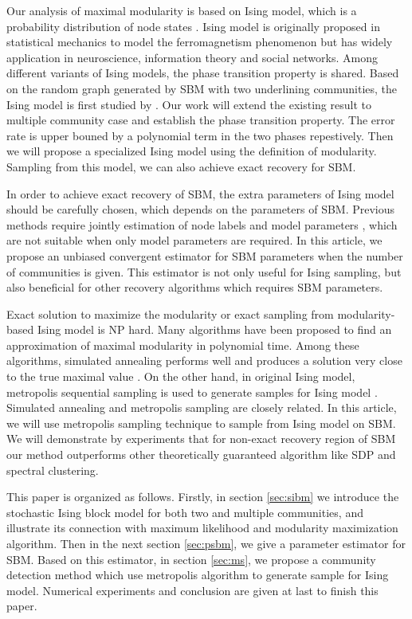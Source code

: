 \documentclass[journal]{IEEEtran}
\newcommand{\1}{\mathbbm{1}}
\begin{document}
Our analysis of maximal modularity is based on Ising model, which is a probability distribution of node states \cite{ising1925beitrag}.
Ising model is originally proposed in statistical mechanics to model the ferromagnetism phenomenon but has widely application in neuroscience, information theory
and social networks. Among different variants of Ising models, the phase transition property is shared. Based on the random graph generated by SBM with two underlining communities,
the Ising model is first studied by \cite{ye2020exact}. Our work will extend the existing result to multiple community case and establish the phase transition
property. The error rate is upper bouned by a polynomial term in the two phases repestively. Then we will propose a specialized Ising model using the definition of modularity. Sampling from this model,
we can also achieve exact recovery for SBM.

In order to achieve exact recovery of SBM, the extra parameters of Ising model should be carefully chosen, which depends on the parameters of SBM. 
Previous methods require jointly estimation of node labels and model parameters \cite{nowicki2001estimation}, which are not suitable when only model parameters are required.
In this article, we propose an unbiased convergent estimator for SBM parameters when the number of communities is given. This estimator is not only useful
for Ising sampling, but also beneficial for other recovery algorithms which requires SBM parameters.

Exact solution to maximize the modularity or exact sampling from modularity-based Ising model is NP hard. Many algorithms have been proposed to find an approximation of maximal modularity in polynomial time.
Among these algorithms, simulated annealing performs well and produces a solution very close to the true maximal value \cite{liu2010detecting}.
On the other hand, in original Ising model,
metropolis sequential sampling is used to generate samples for Ising model \cite{metropolis1953equation}. Simulated annealing and metropolis sampling are closely related. In this article, we will
use metropolis sampling technique to sample from Ising model on SBM. We will demonstrate by experiments that for non-exact recovery region of SBM our method outperforms other
theoretically guaranteed algorithm like SDP and spectral clustering.

This paper is organized as follows. Firstly, in section \ref{sec:sibm} we introduce the stochastic Ising block model for both two and multiple communities, and illustrate its connection with maximum likelihood and modularity
maximization algorithm. Then in the next section \ref{sec:psbm}, we give a parameter estimator for SBM. Based on this estimator, in section \ref{sec:ms},
we propose a community detection method which use metropolis algorithm to generate sample for Ising model. Numerical experiments and conclusion are given at last
to finish this paper.
\end{document}
